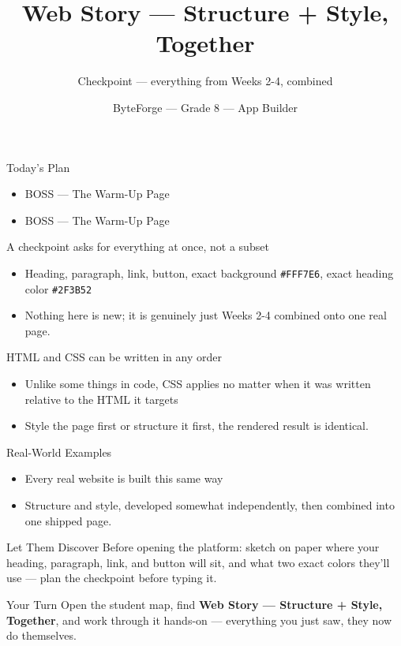 \documentclass[aspectratio=169]{beamer}
\title{Web Story — Structure + Style, Together}
\subtitle{Checkpoint — everything from Weeks 2-4, combined}
\author{ByteForge --- Grade 8 --- App Builder}
\date{}
\begin{document}
\begin{frame}
    \titlepage
\end{frame}

\begin{frame}{Today's Plan}
    \begin{itemize}
        \item BOSS — The Warm-Up Page
        \item[$\bigstar$] BOSS --- The Warm-Up Page
    \end{itemize}
\end{frame}

\begin{frame}{A checkpoint asks for everything at once, not a subset}
    \large
    \begin{itemize}
        \item Heading, paragraph, link, button, exact background \texttt{\#FFF7E6}, exact heading color \texttt{\#2F3B52}
        \item Nothing here is new; it is genuinely just Weeks 2-4 combined onto one real page.
    \end{itemize}
\end{frame}


\begin{frame}{HTML and CSS can be written in any order}
    \large
    \begin{itemize}
        \item Unlike some things in code, CSS applies no matter when it was written relative to the HTML it targets
        \item Style the page first or structure it first, the rendered result is identical.
    \end{itemize}
\end{frame}

\begin{frame}{Real-World Examples}
    \large
    \begin{itemize}
        \item Every real website is built this same way
        \item Structure and style, developed somewhat independently, then combined into one shipped page.
    \end{itemize}
\end{frame}


\begin{frame}{Let Them Discover}
    \Large
    Before opening the platform: sketch on paper where your heading, paragraph, link, and button will sit, and what two exact colors they'll use — plan the checkpoint before typing it.
\end{frame}

\begin{frame}{Your Turn}
    \Large
    Open the student map, find \textbf{Web Story — Structure + Style, Together}, and work through it
    hands-on --- everything you just saw, they now do themselves.
\end{frame}
\end{document}
